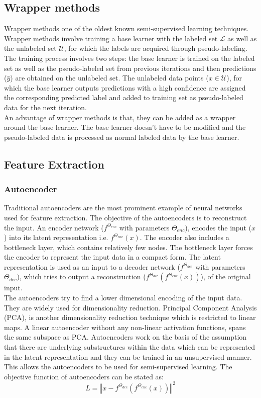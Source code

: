 \subsection{Wrapper methods}
Wrapper methods one of the oldest known semi-supervised learning techniques\cite{van2020}. Wrapper methods involve training a base learner with the labeled set $\mathcal{L}$ as well as the unlabeled set $\mathcal{U}$, for which the labels are acquired through pseudo-labeling\cite{mclachlan1975}. The training process involves two steps: the base learner is trained on the labeled set as well as the pseudo-labeled set from previous iterations and then predictions ($\hat{y}$) are obtained on the unlabeled set. The unlabeled data points ($x \in \mathcal{U}$), for which the base learner outputs predictions with a high confidence are assigned the corresponding predicted label and added to training set as pseudo-labeled data for the next iteration. \\
An advantage of wrapper methods is that, they can be added as a wrapper around the base learner. The base learner doesn't have to be modified and the pseudo-labeled data is processed as normal labeled data by the base learner.

\subsection{Feature Extraction}
\subsubsection{Autoencoder\cite{kramer1991}}
Traditional autoencoders are the most prominent example of neural networks used for feature extraction. The objective of the autoencoders is to reconstruct the input. An encoder network ($f^{\Theta_{enc}}$ with parameters $\Theta_{enc}$), encodes the input ($x$) into its latent representation i.e. $f^{\Theta_{enc}}(x)$. The encoder also includes a bottleneck layer, which contains relatively few nodes. The bottleneck layer forces the encoder to represent the input data in a compact form. The latent representation is used as an input to a decoder network ($f^{\Theta_{dec}}$ with parameters $\Theta_{dec}$), which tries to output a reconstruction ($f^{\Theta_{dec}}(f^{\Theta_{enc}}(x))$), of the original input. \\
The autoencoders try to find a lower dimensional encoding of the input data. They are widely used for dimensionality reduction. Principal Component Analysis (PCA), is another dimensionality reduction technique which is restricted to linear maps. A linear autoencoder without any non-linear activation functions, spans the same subspace as PCA\cite{baldi1989}. Autoencoders work on the basis of the assumption that there are underlying substructures within the data which can be represented in the latent representation and they can be trained in an unsupervised manner. This allows the autoencoders to be used for semi-supervised learning.
The objective function of autoencoders can be stated as:
\begin{equation}
    \label{equation:autoencoders_loss}
    L = \left\Vert x - f^{\Theta_{dec}}(f^{\Theta_{enc}}(x)) \right\Vert^2
\end{equation}

